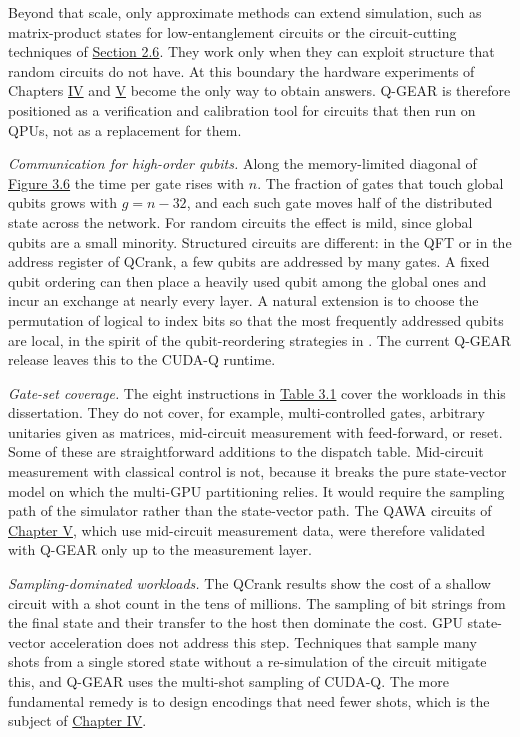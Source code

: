 \documentclass{report}
\theoremstyle{plain}
\theoremstyle{definition}
\theoremstyle{remark}
\begin{document}
Beyond that scale, only approximate methods can extend simulation, such as matrix-product states \cite{perezgarcia2006mps} for low-entanglement circuits or the circuit-cutting techniques of \hyperref[sec:bg:cutting]{Section 2.6}. They work only when they can exploit structure that random circuits do not have. At this boundary the hardware experiments of Chapters \hyperref[ch:qml]{IV} and \hyperref[ch:nisq]{V} become the only way to obtain answers. Q-GEAR is therefore positioned as a verification and calibration tool for circuits that then run on QPUs, not as a replacement for them.

\emph{Communication for high-order qubits.} Along the memory-limited diagonal of \hyperref[fig:qgear:scaling]{Figure 3.6} the time per gate rises with $n$. The fraction of gates that touch global qubits grows with $g=n-32$, and each such gate moves half of the distributed state across the network. For random circuits the effect is mild, since global qubits are a small minority. Structured circuits are different: in the QFT or in the address register of QCrank, a few qubits are addressed by many gates. A fixed qubit ordering can then place a heavily used qubit among the global ones and incur an exchange at nearly every layer. A natural extension is to choose the permutation of logical to index bits so that the most frequently addressed qubits are local, in the spirit of the qubit-reordering strategies in \cite{bayraktar2023cuquantum,doi2023multishotgpu}. The current Q-GEAR release leaves this to the CUDA-Q runtime.

\emph{Gate-set coverage.} The eight instructions in \hyperref[tab:qgear:gates]{Table 3.1} cover the workloads in this dissertation. They do not cover, for example, multi-controlled gates, arbitrary unitaries given as matrices, mid-circuit measurement with feed-forward, or reset. Some of these are straightforward additions to the dispatch table. Mid-circuit measurement with classical control is not, because it breaks the pure state-vector model on which the multi-GPU partitioning relies. It would require the sampling path of the simulator rather than the state-vector path. The QAWA circuits of \hyperref[ch:nisq]{Chapter V}, which use mid-circuit measurement data, were therefore validated with Q-GEAR only up to the measurement layer.

\emph{Sampling-dominated workloads.} The QCrank results show the cost of a shallow circuit with a shot count in the tens of millions. The sampling of bit strings from the final state and their transfer to the host then dominate the cost. GPU state-vector acceleration does not address this step. Techniques that sample many shots from a single stored state without a re-simulation of the circuit \cite{doi2023multishotgpu} mitigate this, and Q-GEAR uses the multi-shot sampling of CUDA-Q. The more fundamental remedy is to design encodings that need fewer shots, which is the subject of \hyperref[ch:qml]{Chapter IV}.
\end{document}
